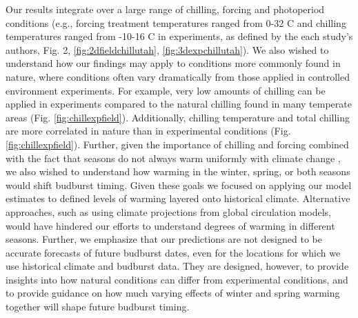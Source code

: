 \documentclass{article}
\begin{document}
Our results integrate over a large range of chilling, forcing and photoperiod conditions (e.g., forcing treatment temperatures ranged from 0-32 \degree C and chilling temperatures ranged from -10-16 \degree C in experiments, as defined by the each study's authors, Fig. 2, \ref{fig:2dfieldchillutah}, \ref{fig:3dexpchillutah}). We also wished to understand how our findings may apply to conditions more commonly found in nature, where conditions often vary dramatically from those applied in controlled environment experiments. For example, very low amounts of chilling can be applied in experiments compared to the natural chilling found in many temperate areas (Fig. \ref{fig:chillexpfield}). Additionally, chilling temperature and total chilling are more correlated in nature than in experimental conditions (Fig. \ref{fig:chillexpfield}). Further, given the importance of chilling and forcing combined with the fact that seasons do not always warm uniformly with climate change \citep{vautard2014,eea2019}, we also wished to understand how warming in the winter, spring, or both seasons would shift budburst timing. Given these goals we focused on applying our model estimates to defined levels of warming layered onto historical climate. Alternative approaches, such as using climate projections from global circulation models, would have hindered our efforts to understand degrees of warming in different seasons. Further, we emphasize that our predictions are not designed to be accurate forecasts of future budburst dates, even for the locations for which we use historical climate and budburst data. They are designed, however, to provide insights into how natural conditions can differ from experimental conditions, and to provide guidance on how much varying effects of winter and spring warming together will shape future budburst timing.
\end{document}
